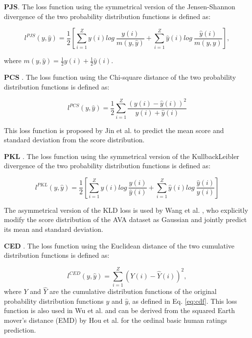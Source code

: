 \documentclass[letterpaper]{article} %
\begin{document}
\textbf{PJS}. The loss function using the symmetrical version of the Jensen-Shannon divergence of the two probability distribution functions is defined as:


\begin{small}
\begin{equation}
l^{PJS}(y,\hat{y}) =
\frac{1}{2}
[
\sum_{i=1}^{Z}y(i)log~\frac{y(i)}{m(y,\hat{y})}
+
\sum_{i=1}^{Z}\hat{y}(i)log~\frac{\hat{y}(i)}{m(y,\hat{y})}
],
\label{eq:PJS}
\end{equation}
\end{small}
where $m(y,\hat{y}) = \frac{1}{2}y(i)+\frac{1}{2}\hat{y}(i)$.


\textbf{PCS} \cite{JinICIP2016}. The loss function using the Chi-square distance of the two probability distribution functions is defined as:


\begin{small}
\begin{equation}
l^{PCS}(y,\hat{y}) =
\frac{1}{2}
\sum_{i=1}^{Z}\frac{(y(i)-\hat{y}(i))^2}{y(i)+\hat{y}(i)}
\label{eq:PCS}
\end{equation}
\end{small}
This loss function is proposed by Jin et al. \cite{JinICIP2016} to predict the mean score and standard deviation from the score distribution.


\textbf{PKL} \cite{WangIJCNN2017}. The loss function using the symmetrical version of the KullbackLeibler divergence of the two probability distribution functions is defined as:


\begin{small}
\begin{equation}
l^{PKL}(y,\hat{y}) =
\frac{1}{2}
[
\sum_{i=1}^{Z}y(i)log~\frac{y(i)}{\hat{y}(i)}
+
\sum_{i=1}^{Z}\hat{y}(i)log~\frac{\hat{y}(i)}{y(i)}
]
\label{eq:PKL}
\end{equation}
\end{small}
The asymmetrical version of the KLD loss is used by Wang et al. \cite{WangIJCNN2017}, who
explicitly modify the score distribution of the AVA dataset as Gaussian and jointly predict its mean and standard deviation.

\textbf{CED} \cite{WuICCV2011,HouArXiv2016}. The loss function using the Euclidean distance of the two cumulative distribution functions is defined as:

\begin{equation}
l^{CED}(y,\hat{y}) = \sum_{i=1}^{Z}(Y(i)-\hat{Y}(i))^2,
\label{eq:CED}
\end{equation}
where $Y$ and $\hat{Y}$ are the cumulative distribution functions of the original probability distribution functions $y$ and $\hat{y}$, as defined in Eq. \ref{eq:cdf}. This loss function is also used in Wu et al. \cite{WuICCV2011} and can be derived from the squared Earth mover's distance (EMD) by Hou et al.  \cite{HouArXiv2016} for the ordinal basic human ratings prediction.
\end{document}
